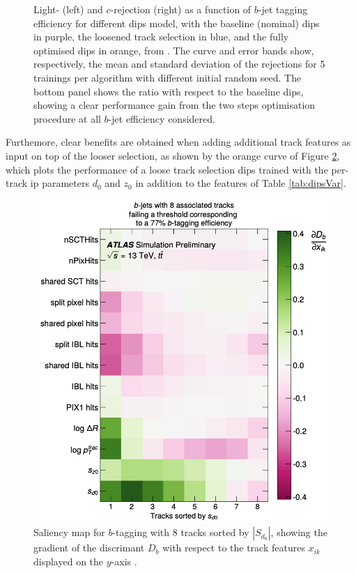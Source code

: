\begin{figure}[h!]
\begin{subfigure}[b]{0.48\textwidth}
      \label{fig:dipsOptRocC}
  \end{subfigure}
  \caption{Light- (left) and $c$-rejection (right) as a function of $b$-jet tagging efficiency for different \gls{dips} model, with the baseline (nominal) \gls{dips} in purple, the loosened track selection in blue, and the fully optimised \gls{dips} in orange, from \cite{ATL-PHYS-PUB-2020-014}. The curve and error bands show, respectively, the mean and standard deviation of the rejections for 5 trainings per algorithm with different initial random seed. The bottom panel shows the ratio with respect to the baseline \gls{dips}, showing a clear performance gain from the two steps optimisation procedure at all $b$-jet efficiency considered.}
  \label{fig:dipsOptRoc}
\end{figure} 

Furthemore, clear benefits are obtained when adding additional track features as input on top of the looser selection, as shown by the orange curve of Figure \ref{fig:dipsOptRoc}, which plots the performance of a loose track selection \gls{dips} trained with the per-track \gls{ip} parameters $d_0$ and $z_0$ in addition to the features of Table \ref{tab:dipsVar}.

\begin{figure}[h!]
  \center
  \begin{minipage}[c]{0.7\textwidth}
    \includegraphics[width=\textwidth]{Images/FTAG/dipsSaliency.png}
  \end{minipage}
  \begin{minipage}[c]{0.25\textwidth}
    \caption{Saliency map for $b$-tagging with 8 tracks sorted by $|S_{d_0}|$, showing the gradient of the discrimant $D_b$ with respect to the track features $x_{ik}$ displayed on the $y$-axis \cite{ATL-PHYS-PUB-2020-014}.} 
  \label{fig:dipsSaliency}
  \end{minipage}
\end{figure}

